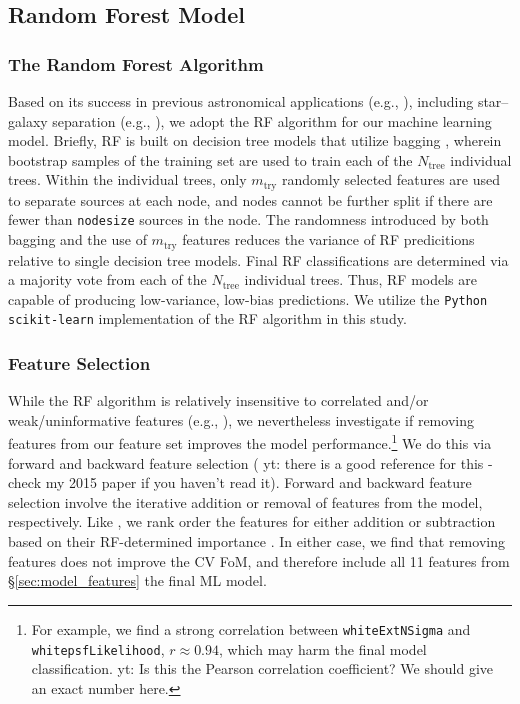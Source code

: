 \documentclass[twocolumn]{aastex62}
\newcommand{\yutaro}[1]{{\color{red} yt: {#1}}}
\begin{document}
\subsection{Random Forest Model}\label{sec:rf_model}

\subsubsection{The Random Forest Algorithm}\label{sec:rf_alg}

Based on its success in previous astronomical applications (e.g., \citealt{Richards12a, Huppenkothen17, Brink13, Wright15, Goldstein15}), including
star--galaxy separation (e.g., \citealt{Vasconcellos11,Miller17}), we adopt
the RF algorithm \citep{Breiman01} for our machine learning model. Briefly,
RF is built on decision tree models \citep{Quinlan93} that utilize bagging
\citep{Breiman96}, wherein bootstrap samples of the training set are used to
train each of the $N_{\mathrm{tree}}$ individual trees. Within the
individual trees, only $m_{\mathrm{try}}$ randomly selected features are
used to separate sources at each node, and nodes cannot be further split if
there are fewer than \texttt{nodesize} sources in the node. The randomness
introduced by both bagging and the use of $m_{\mathrm{try}}$ features
reduces the variance of RF predicitions relative to single decision tree
models. Final RF classifications are determined via a majority vote from
each of the $N_{\mathrm{tree}}$ individual trees. Thus, RF models are
capable of producing low-variance, low-bias predictions. We utilize the
\texttt{Python scikit-learn} implementation of the RF algorithm
\citep{Pedregosa12} in this study.

\subsubsection{Feature Selection}

While the RF algorithm is relatively insensitive to correlated and/or weak/uninformative features (e.g., \citealt{Richards12a}), we nevertheless investigate if removing features from our feature set improves the model performance.\footnote{For example, we find a strong correlation between \texttt{whiteExtNSigma} and \texttt{whitepsfLikelihood}, $r \approx 0.94$, which may harm the final model classification. \yutaro{Is this the Pearson correlation coefficient? We should give an exact number here.}}
 We do this via forward and backward feature selection (\yutaro{there is a good reference for this - check my 2015 paper if you haven't read it}). Forward and backward feature selection involve the iterative addition or removal of features from the model, respectively. Like \citet{Richards12a}, we rank order the features for either addition or subtraction based on their RF-determined importance \citep{Breiman02}.
In either case, we find that removing features does not improve the CV FoM, and therefore include all 11 features from \S\ref{sec:model_features} the final ML model.
\end{document}
